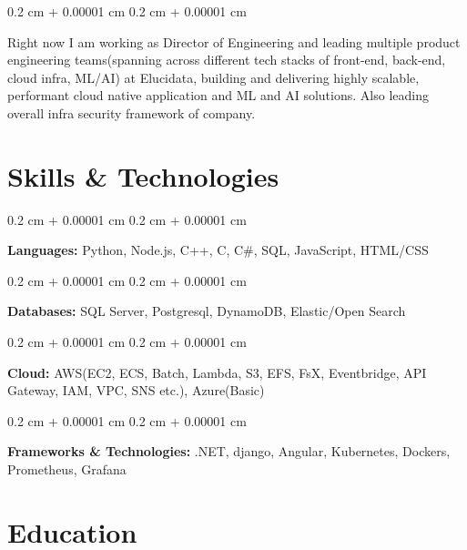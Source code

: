 \documentclass[10pt, letterpaper]{article}
\newenvironment{onecolentry}{
    \begin{adjustwidth}{
        0.2 cm + 0.00001 cm
    }{
        0.2 cm + 0.00001 cm
    }
}{
    \end{adjustwidth}
} %
\begin{document}
        \vspace{0.2 cm}

        \begin{onecolentry}
            Right now I am working as Director of Engineering and leading multiple
product engineering teams(spanning across different tech stacks of front-end, back-end, cloud infra, ML/AI) at
Elucidata, building and delivering highly scalable, performant cloud native application and ML and AI solutions. Also leading 
overall infra security framework of company.
        \end{onecolentry}


    
    \section{Skills \& Technologies}

        \begin{onecolentry}
            \textbf{Languages:} Python, Node.js, C++, C, C\#, SQL, JavaScript, HTML/CSS
        \end{onecolentry}

        \vspace{0.2 cm}

        \begin{onecolentry}
            \textbf{Databases:} SQL Server, Postgresql, DynamoDB, Elastic/Open Search
        \end{onecolentry}

        \vspace{0.2 cm}

        \begin{onecolentry}
            \textbf{Cloud:} AWS(EC2, ECS, Batch, Lambda, S3, EFS, FsX, Eventbridge, API Gateway, IAM, VPC, SNS etc.), Azure(Basic)
        \end{onecolentry}

        \vspace{0.2 cm}

        \begin{onecolentry}
            \textbf{Frameworks \& Technologies:} .NET, django, Angular, Kubernetes, Dockers, Prometheus, Grafana
        \end{onecolentry}

    \section{Education}
\end{document}
